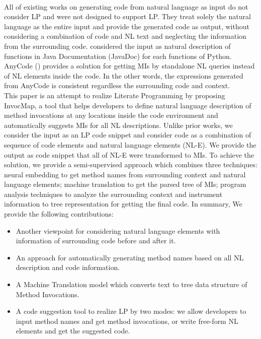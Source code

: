 \\
All of existing works \cite{007,008,009,010} on generating code from natural language as input do not consider LP and were not designed to support LP. They treat solely the natural language as the entire input and provide the generated code as output, without considering a combination of code and NL text and neglecting the information from the surrounding code. \cite{010} considered the input as natural description of functions in Java Documentation (JavaDoc) for each functions of Python. AnyCode (\cite{007}) provides a solution for getting MIs by standalone NL queries instead of NL elements inside the code. In the other words, the expressions generated from AnyCode is consistent regardless the surrounding code and context.
\\
This paper is an attempt to realize Literate Programming by proposing InvocMap, a tool that helps developers to define natural language description of method invocations at any locations inside the code environment and automatically suggests MIs for all NL descriptions. Unlike prior works, we consider the input as an LP code snippet and consider code as a combination of sequence of code elements and natural language elements (NL-E). We provide the output as code snippet that all of NL-E were transformed to MIs. To achieve the solution, we provide a semi-supervised approach which combines three techniques: neural embedding to get method names from surrounding context and natural language elements; machine translation to get the parsed tree of MIs; program analysis techniques to analyze the surrounding context and instrument information to tree representation for getting the final code. In summary, We provide the following contributions:
\begin{itemize}
	\item Another viewpoint for considering natural language elements with information of surrounding code before and after it. 
	\item An approach for automatically generating method names based on all NL description and code information. 
	\item A Machine Translation model which converts text to tree data structure of Method Invocations.
	\item A code suggestion tool to realize LP by two modes: we allow developers to input method names and get method invocations, or  write free-form NL elements and get the suggested code.
\end{itemize}
